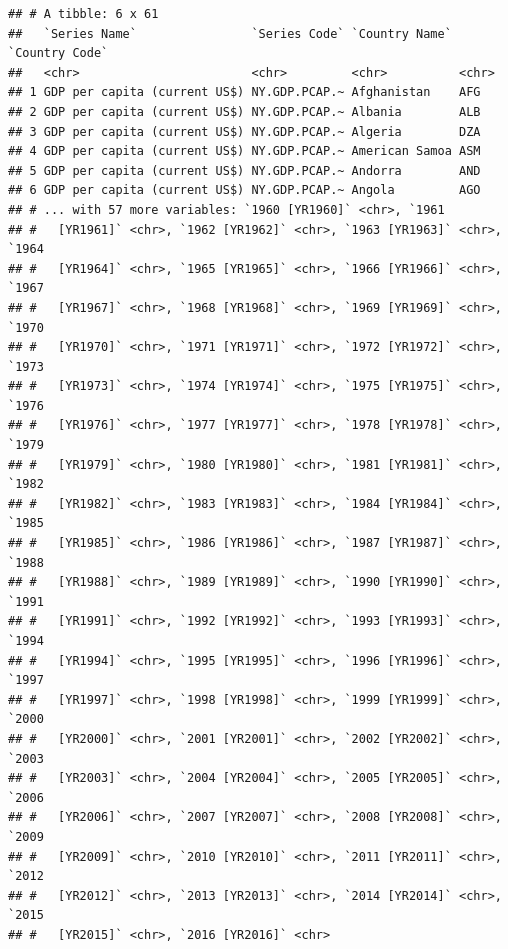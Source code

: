 \documentclass[12pt,]{article}
\begin{document}
\begin{verbatim}
## # A tibble: 6 x 61
##   `Series Name`                `Series Code` `Country Name` `Country Code`
##   <chr>                        <chr>         <chr>          <chr>         
## 1 GDP per capita (current US$) NY.GDP.PCAP.~ Afghanistan    AFG           
## 2 GDP per capita (current US$) NY.GDP.PCAP.~ Albania        ALB           
## 3 GDP per capita (current US$) NY.GDP.PCAP.~ Algeria        DZA           
## 4 GDP per capita (current US$) NY.GDP.PCAP.~ American Samoa ASM           
## 5 GDP per capita (current US$) NY.GDP.PCAP.~ Andorra        AND           
## 6 GDP per capita (current US$) NY.GDP.PCAP.~ Angola         AGO           
## # ... with 57 more variables: `1960 [YR1960]` <chr>, `1961
## #   [YR1961]` <chr>, `1962 [YR1962]` <chr>, `1963 [YR1963]` <chr>, `1964
## #   [YR1964]` <chr>, `1965 [YR1965]` <chr>, `1966 [YR1966]` <chr>, `1967
## #   [YR1967]` <chr>, `1968 [YR1968]` <chr>, `1969 [YR1969]` <chr>, `1970
## #   [YR1970]` <chr>, `1971 [YR1971]` <chr>, `1972 [YR1972]` <chr>, `1973
## #   [YR1973]` <chr>, `1974 [YR1974]` <chr>, `1975 [YR1975]` <chr>, `1976
## #   [YR1976]` <chr>, `1977 [YR1977]` <chr>, `1978 [YR1978]` <chr>, `1979
## #   [YR1979]` <chr>, `1980 [YR1980]` <chr>, `1981 [YR1981]` <chr>, `1982
## #   [YR1982]` <chr>, `1983 [YR1983]` <chr>, `1984 [YR1984]` <chr>, `1985
## #   [YR1985]` <chr>, `1986 [YR1986]` <chr>, `1987 [YR1987]` <chr>, `1988
## #   [YR1988]` <chr>, `1989 [YR1989]` <chr>, `1990 [YR1990]` <chr>, `1991
## #   [YR1991]` <chr>, `1992 [YR1992]` <chr>, `1993 [YR1993]` <chr>, `1994
## #   [YR1994]` <chr>, `1995 [YR1995]` <chr>, `1996 [YR1996]` <chr>, `1997
## #   [YR1997]` <chr>, `1998 [YR1998]` <chr>, `1999 [YR1999]` <chr>, `2000
## #   [YR2000]` <chr>, `2001 [YR2001]` <chr>, `2002 [YR2002]` <chr>, `2003
## #   [YR2003]` <chr>, `2004 [YR2004]` <chr>, `2005 [YR2005]` <chr>, `2006
## #   [YR2006]` <chr>, `2007 [YR2007]` <chr>, `2008 [YR2008]` <chr>, `2009
## #   [YR2009]` <chr>, `2010 [YR2010]` <chr>, `2011 [YR2011]` <chr>, `2012
## #   [YR2012]` <chr>, `2013 [YR2013]` <chr>, `2014 [YR2014]` <chr>, `2015
## #   [YR2015]` <chr>, `2016 [YR2016]` <chr>
\end{verbatim}
\end{document}
